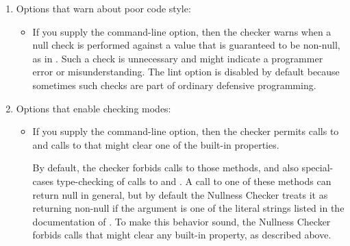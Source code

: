 \begin{enumerate}
\item
  Options that warn about poor code style:

\begin{itemize}
\item
  \label{nullness-lint-nulltest}%
  If you supply the  command-line option, then the
  checker warns when a null check is performed against a value that is
  guaranteed to be non-null, as in .  Such a check is
  unnecessary and might indicate a programmer error or misunderstanding.
  The lint option is disabled by default because sometimes such checks are
  part of ordinary defensive programming.
\end{itemize}

\item
  Options that enable checking modes:

\begin{itemize}
\item
  If you supply the  command-line option,
  then the checker permits calls to
  and calls to
  that might clear one of the built-in properties.

  By default, the checker forbids calls to those methods, and also
  special-cases type-checking of calls to
  and
  .
  A call to one of these methods
  can return null in general, but by default the Nullness Checker treats it
  as returning non-null if the argument is one of the literal strings
  listed in the documentation of
  .
  To make this behavior sound, the Nullness Checker forbids calls that
  might clear any built-in property, as described above.
\end{itemize}

\end{enumerate}



